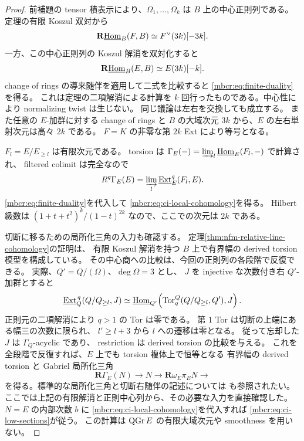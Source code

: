 \begin{proof}
前補題の tensor 積表示により、$\Omega_1,\ldots,\Omega_k$ は
$B$ 上の中心正則列である。
定理の有限 Koszul 双対から
\[
 \mathbf R\underline{\operatorname{Hom}}_B(F,B)\simeq F^\vee(3k)[-3k].
\]
一方、この中心正則列の Koszul 解消を双対化すると
\[
 \mathbf R\underline{\operatorname{Hom}}_B(E,B)\simeq E(3k)[-k].
\]
change of rings の導来随伴を適用して二式を比較すると
\eqref{mbcr:eq:finite-duality}を得る。
これは定理の二項解消による計算を
$k$ 回行ったものである。中心性により normalizing twist は生じない。
同じ議論は左右を交換しても成立する。
また任意の $E$-加群に対する change of rings と
$B$ の大域次元 $3k$ から、$E$ の左右単射次元は高々 $2k$ である。
$F=K$ の非零な第 $2k$ Ext により等号となる。

$F_l=E/E_{\geq l}$ は有限次元である。
torsion は
$\Gamma_E(-)=\varinjlim_l\underline{\operatorname{Hom}}_E(F_l,-)$ で計算され、
filtered colimit は完全なので
\[
 R^q\Gamma_E(E)
   =\varinjlim_l\underline{\operatorname{Ext}}^q_E(F_l,E).
\]
\eqref{mbcr:eq:finite-duality}を代入して
\eqref{mbcr:eq:ci-local-cohomology}を得る。
Hilbert 級数は
$(1+t+t^2)^k/(1-t)^{2k}$ なので、ここでの次元は $2k$ である。

切断に移るための局所化三角の入力も確認する。
定理\ref{thm:nfm-relative-line-cohomology}の証明は、
有限 Koszul 解消を持つ $B$ 上で有界幅の derived torsion 模型を構成している。
その中心商への比較は、今回の正則列の各段階で反復できる。
実際、$Q'=Q/(\Omega)$、$\deg\Omega=3$ とし、
$J$ を injective な次数付き右 $Q'$-加群とすると
\[
 \underline{\operatorname{Ext}}^{\,q}_Q(Q/Q_{\geq l},J)
 \simeq
 \underline{\operatorname{Hom}}_{Q'}\!
 \left(\operatorname{Tor}^{Q}_q(Q/Q_{\geq l},Q'),J\right).
\]
正則元の二項解消により $q>1$ の Tor は零である。
第 $1$ Tor は切断の上端にある幅三の次数に限られ、
$l'\geq l+3$ から $l$ への遷移は零となる。
従って忘却した $J$ は $\Gamma_Q$-acyclic であり、
restriction は derived torsion の比較を与える。
これを全段階で反復すれば、$E$ 上でも torsion 複体上で恒等となる
有界幅の derived torsion と Gabriel 局所化三角
\begin{equation}\label{mbcr:eq:localization}
 \mathbf R\Gamma_E(N)\longrightarrow N
 \longrightarrow\mathbf R\omega_E\pi_EN\longrightarrow
\end{equation}
を得る。標準的な局所化三角と切断右随伴の記述については
\cite[\S4, Proposition~4.5 and equation~(4.15)]{NFMBurkeStevenson}も参照されたい。
ここでは上記の有限解消と正則中心列から、その必要な入力を直接確認した。
$N=E$ の内部次数 $b$ に
\eqref{mbcr:eq:ci-local-cohomology}を代入すれば
\eqref{mbcr:eq:ci-low-sections}が従う。
この計算は $\operatorname{QGr} E$ の有限大域次元や smoothness を用いない。
\end{proof}

